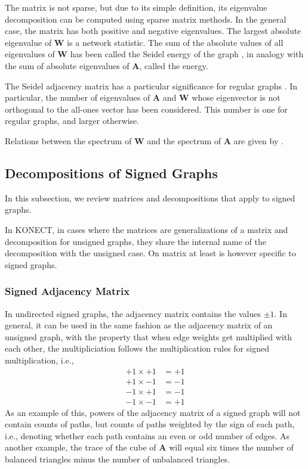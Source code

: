 \documentclass{article}
\begin{document}
The matrix is not sparse, but due to its simple definition, its
eigenvalue decomposition can be computed using sparse matrix methods. 
In the general case, the matrix has both positive and negative
eigenvalues. 
The largest absolute eigenvalue of $\mathbf W$ is a network statistic.
The sum of the absolute values of all eigenvalues of $\mathbf W$ has
been called the Seidel energy of the graph \citep{b909}, in analogy with
the sum of absolute eigenvalues of $\mathbf A$, called the energy. 

The Seidel adjacency matrix has a particular significance for regular
graphs \citep{b908}.  In particular, the number of eigenvalues of
$\mathbf A$ and $\mathbf W$ whose eigenvector is not orthogonal to the
all-ones vector has been considered.  This number is one for regular
graphs, and larger otherwise. 

Relations between the spectrum of $\mathbf W$ and the spectrum of
$\mathbf A$ are given by \cite{b908}.

\subsection{Decompositions of Signed Graphs}
In this subsection, we review matrices and decompositions that apply to
signed graphs.  

In KONECT, in cases where the matrices are generalizations of a matrix and
decomposition for unsigned graphs, they share the internal name of the
decomposition with the unsigned case.  On matrix at least is however
specific to signed graphs. 

\subsubsection{Signed Adjacency Matrix}
In undirected signed graphs, the adjacency matrix contains the values
$\pm 1$.  In general, it can be used in the same fashion as the
adjacency matrix of an unsigned graph, with the property that when edge
weights get multiplied with each other, the multipliciation follows the
multiplication rules for signed multiplication, i.e., 
\begin{align*}
  +1 \times +1 &= +1 \\
  +1 \times -1 &= -1 \\
  -1 \times +1 &= -1 \\
  -1 \times -1 &= +1 
\end{align*}
As an example of this, powers of the adjacency matrix of a signed graph
will not contain counts of paths, but counts of paths weighted by the
sign of each path, i.e., denoting whether each path contains an even or
odd number of edges.  As another example, the trace of the cube of
$\mathbf A$ will equal six times the number of balanced triangles minus
the number of unbalanced triangles. 
\end{document}
